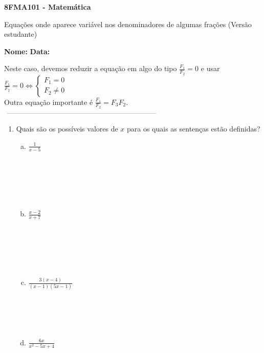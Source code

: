 \documentclass[a4paper,14pt]{article}
\begin{document}
	
	\noindent\textbf{8FMA101 - Matemática} 
	
	\begin{center}Equações onde aparece variável nos denominadores de algumas frações (Versão estudante)
	\end{center}
	
	\noindent\textbf{Nome:} \underline{\hspace{10cm}}
	\noindent\textbf{Data:} \underline{\hspace{4cm}}
	
    \begin{multicols}{2}
    	\noindent Neste caso, devemos reduzir a equação em algo do tipo $\frac{F_1}{F_2} = 0$ e usar $\frac{F_1}{F_2} = 0 \Leftrightarrow \begin{cases}F_1 = 0 \\ F_2 \neq 0 \end{cases}$ \\ 
    	Outra equação importante é $\frac{F_1}{F_2} = {F_3}{F_2}$. \\
    	\noindent\textsubscript{~---------------------------------------------------------------------------}
    	\begin{enumerate}
    		\item Quais são os possíveis valores de $x$ para os quais as sentenças estão definidas?
    		\begin{enumerate}[a)]
    			\item $\frac{1}{x - 5}$ \\\\\\\\\\\\
    			\item $\frac{x - 2}{x + 7}$ \\\\\\\\\\\\
    			\item $\frac{3(x - 4)}{(x - 1)(5x - 1)}$ \\\\\\\\\\
    			\item $\frac{6x}{x^2 - 5x + 4}$ \\\\\\\\\\\\

\end{enumerate}
\end{enumerate}
\end{multicols}
\end{document}
